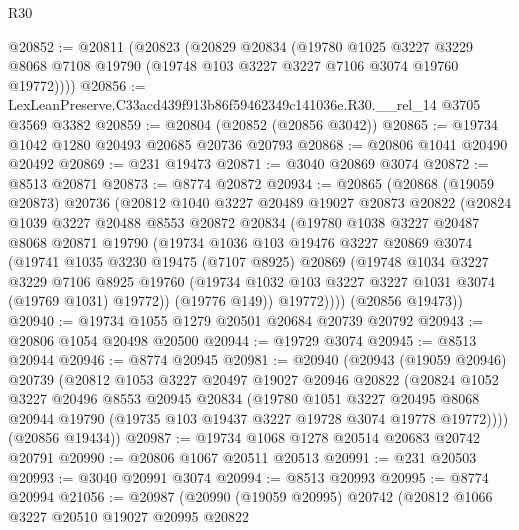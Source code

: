 \begin{lexlean}{R30}
\begin{coremodule}
@20852 := @20811
    (@20823
      (@20829
        @20834
        (@19780
          @1025
          @3227
          @3229
          @8068
          @7108
          @19790
          (@19748 @103 @3227 @3227 @7106 @3074 @19760 @19772))))
@20856 := LexLeanPreserve.C33acd439f913b86f59462349c141036e.R30.__rel_14 @3705 @3569 @3382
@20859 := @20804 (@20852 (@20856 @3042))
@20865 := @19734 @1042 @1280 @20493 @20685 @20736 @20793
@20868 := @20806 @1041 @20490 @20492
@20869 := @231 @19473
@20871 := @3040 @20869 @3074
@20872 := @8513 @20871
@20873 := @8774 @20872
@20934 := @20865
    (@20868
      (@19059 @20873)
      @20736
      (@20812
        @1040
        @3227
        @20489
        @19027
        @20873
        @20822
        (@20824
          @1039
          @3227
          @20488
          @8553
          @20872
          @20834
          (@19780
            @1038
            @3227
            @20487
            @8068
            @20871
            @19790
            (@19734
              @1036
              @103
              @19476
              @3227
              @20869
              @3074
              (@19741
                @1035
                @3230
                @19475
                (@7107 @8925)
                @20869
                (@19748
                  @1034
                  @3227
                  @3229
                  @7106
                  @8925
                  @19760
                  (@19734 @1032 @103 @3227 @3227 @1031 @3074 (@19769 @1031) @19772))
                (@19776 @149))
              @19772))))
      (@20856 @19473))
@20940 := @19734 @1055 @1279 @20501 @20684 @20739 @20792
@20943 := @20806 @1054 @20498 @20500
@20944 := @19729 @3074
@20945 := @8513 @20944
@20946 := @8774 @20945
@20981 := @20940
    (@20943
      (@19059 @20946)
      @20739
      (@20812
        @1053
        @3227
        @20497
        @19027
        @20946
        @20822
        (@20824
          @1052
          @3227
          @20496
          @8553
          @20945
          @20834
          (@19780
            @1051
            @3227
            @20495
            @8068
            @20944
            @19790
            (@19735 @103 @19437 @3227 @19728 @3074 @19778 @19772))))
      (@20856 @19434))
@20987 := @19734 @1068 @1278 @20514 @20683 @20742 @20791
@20990 := @20806 @1067 @20511 @20513
@20991 := @231 @20503
@20993 := @3040 @20991 @3074
@20994 := @8513 @20993
@20995 := @8774 @20994
@21056 := @20987
    (@20990
      (@19059 @20995)
      @20742
      (@20812
        @1066
        @3227
        @20510
        @19027
        @20995
        @20822

\end{coremodule}
\end{lexlean}
